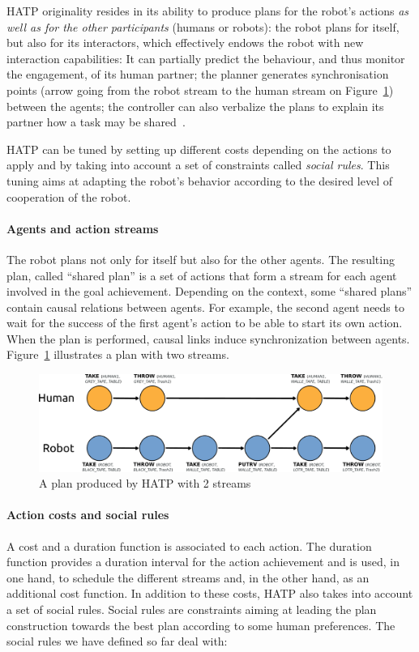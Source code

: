 \documentclass[preprint,3p,times]{elsarticle}
\begin{document}
HATP originality resides in its ability to produce plans for the robot's
actions \emph{as well as for the other participants} (humans or robots): the
robot plans for itself, but also for its interactors, which effectively endows the robot
with new interaction capabilities: It can partially predict the behaviour, and
thus monitor the engagement, of its human partner; the planner generates
synchronisation points (arrow going from the robot stream to the human stream on
Figure~\ref{plan_hatp1}) between the agents; the controller can also verbalize
the plans to explain its partner how a task may be shared~\cite{warnier2012when}.

HATP can be tuned by setting up different costs depending on the actions to
apply and by taking into account a set of constraints called \emph{social
rules}. This tuning aims at adapting the robot's behavior according to the
desired level of cooperation of the robot.

\paragraph{Agents and action streams}
The robot plans not only for itself but also for the other agents. The
resulting plan, called ``shared plan'' is a set of actions that form
a stream for each agent involved in the goal achievement. Depending on
the context, some ``shared plans'' contain causal relations between
agents. For example, the second agent needs to wait for the success of
the first agent's action to be able to start its own action. When the
plan is performed, causal links induce synchronization between
agents. Figure~\ref{plan_hatp1} illustrates a plan with two streams.

\begin{figure}[htbp]
  \centering
  \includegraphics[width=0.95\columnwidth]{first_plan.pdf}
  \caption{A plan produced by HATP with 2 streams}
  \label{plan_hatp1}
\end{figure}

\paragraph{Action costs and social rules}
A cost and a duration function is associated to each action.
The duration function provides a duration interval for the action
achievement and is used, in one hand, to schedule the different
streams and, in the other hand, as an additional cost function.
In addition to these costs, HATP also takes into account a set of social
rules.  Social rules are constraints aiming at leading the plan
construction towards the best plan according to some human
preferences. The social rules we have defined so far deal with:
\end{document}
